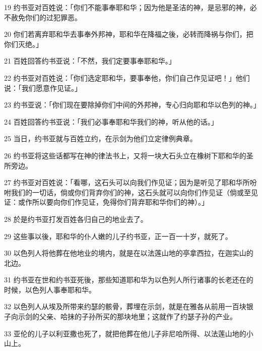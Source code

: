 \par 19 约书亚对百姓说：「你们不能事奉耶和华；因为他是圣洁的神，是忌邪的神，必不赦免你们的过犯罪恶。
\par 20 你们若离弃耶和华去事奉外邦神，耶和华在降福之後，必转而降祸与你们，把你们灭绝。」
\par 21 百姓回答约书亚说：「不然，我们定要事奉耶和华。」
\par 22 约书亚对百姓说：「你们选定耶和华，要事奉他，你们自己作见证吧！」他们说：「我们愿意作见证。」
\par 23 约书亚说：「你们现在要除掉你们中间的外邦神，专心归向耶和华以色列的神。」
\par 24 百姓回答约书亚说：「我们必事奉耶和华我们的神，听从他的话。」
\par 25 当日，约书亚就与百姓立约，在示剑为他们立定律例典章。
\par 26 约书亚将这些话都写在神的律法书上，又将一块大石头立在橡树下耶和华的圣所旁边。
\par 27 约书亚对百姓说：「看哪，这石头可以向我们作见证；因为是听见了耶和华所吩咐我们的一切话，倘或你们背弃你们的神，这石头就可以向你们作见证（倘或至见证：或作所以要向你们作见证，免得你们背弃耶和华你们的神）。」
\par 28 於是约书亚打发百姓各归自己的地业去了。
\par 29 这些事以後，耶和华的仆人嫩的儿子约书亚，正一百一十岁，就死了。
\par 30 以色列人将他葬在他地业的境内，就是在以法莲山地的亭拿西拉，在迦实山的北边。
\par 31 约书亚在世和约书亚死後，那些知道耶和华为以色列人所行诸事的长老还在的时候，以色列人事奉耶和华。
\par 32 以色列人从埃及所带来约瑟的骸骨，葬埋在示剑，就是在雅各从前用一百块银子向示剑的父亲、哈抹的子孙所买的那块地里；这就作了约瑟子孙的产业。
\par 33 亚伦的儿子以利亚撒也死了，就把他葬在他儿子非尼哈所得、以法莲山地的小山上。


